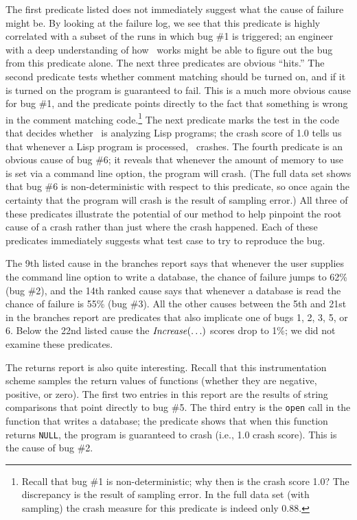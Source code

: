 The first predicate listed does not immediately suggest what the cause
of failure might be. By looking at the failure log, we see that this predicate
is highly correlated with a subset of the runs in which bug \#1 is
triggered; an engineer with a deep understanding of how \moss\ works
might be able to figure out the bug from this predicate alone.
The next three predicates are obvious ``hits.''  The second predicate
tests whether comment matching should be turned on, and if it is turned on the program is
guaranteed to fail. This is a much more obvious cause for bug \#1, and the predicate points directly
to the fact that something is wrong in the comment matching
code.\footnote{Recall that bug \#1 is non-deterministic; why then is
  the crash score 1.0?
The discrepancy is the result of sampling error.  In the full data set
(with  sampling) the crash measure for this predicate is indeed
only 0.88.}
The
next predicate marks the test in the code that decides whether \moss\ is analyzing Lisp
programs; the crash score of 1.0 tells us that whenever a Lisp program is
processed, \moss\ crashes.  The fourth predicate
is an obvious cause of
bug \#6; it reveals that whenever the amount of memory to use is set
via a command line option, the program will crash.  (The full data set shows that bug \#6 is non-deterministic with respect to this predicate, so once again the certainty that the program will crash is the result of sampling error.)  All three of these predicates illustrate the potential of our method to
help pinpoint the root cause of a crash rather than just where the crash
happened.  Each of these predicates immediately suggests
what test case to try to reproduce the bug.

The 9th listed cause in the branches report says that whenever the
user supplies the command line option to write a database, the chance
of failure jumps to 62\% (bug \#2), and the 14th ranked cause says
that whenever a database is read the chance of failure is 55\% (bug
\#3).  All the other causes between the 5th and 21st in the branches
report are predicates that also implicate one of bugs 1, 2, 3, 5, or
6.  Below the 22nd listed cause the $\mbox{\textit{Increase}}(\ldots)$ scores drop to
1\%; we did not examine these predicates.

The returns report is also quite interesting.  Recall that this
instrumentation scheme samples the return values of functions (whether
they are negative, positive, or zero).  The first two entries in this
report are the results of string comparisons that point directly to bug
\#5.  The third entry is the {\tt open} call in the function that writes
a database; the predicate shows that when this function returns {\tt NULL},
the program is guaranteed to crash (i.e., 1.0 crash score).  This is the
cause of bug \#2.

